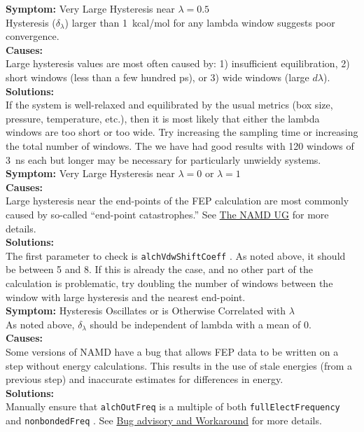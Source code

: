 \documentclass[9pt,tutorial]{Styling/livecoms}
\newcommand{\textInput}[1]{
  \texttt{#1}
}
\begin{document}
\noindent\textbf{Symptom:} Very Large Hysteresis near $\lambda=0.5$\\
Hysteresis ($\delta_\lambda$) larger than 1~kcal/mol for any lambda window suggests poor convergence.\\
\textbf{Causes:}\\
Large hysteresis values are most often caused by: 1) insufficient equilibration, 2) short windows (less than a few hundred ps), or 3) wide windows (large $d\lambda$).\\
\textbf{Solutions:}\\
If the system is well-relaxed and equilibrated by the usual metrics (box size, pressure, temperature, etc.), then it is most likely that either the lambda windows are too short or too wide. Try increasing the sampling time or increasing the total number of windows. The we have had good results with 120 windows of 3~ns each but longer may be necessary for particularly unwieldy systems.\\

\noindent\textbf{Symptom:}  Very Large Hysteresis near $\lambda=0$ or $\lambda=1$\\
\textbf{Causes:}\\
Large hysteresis near the end-points of the FEP calculation are most commonly caused by so-called ``end-point catastrophes.'' See \href{https://www.ks.uiuc.edu/Research/namd/2.14/ug/node63.html}{The NAMD UG} for more details. \cite{Bernardi2020}\\  
\textbf{Solutions:}\\
The first parameter to check is \textInput{alchVdwShiftCoeff}. As noted above, it should be between 5 and 8. If this is already the case, and no other part of the calculation is problematic, try doubling the number of windows between the window with large hysteresis and the nearest end-point.\\

\noindent\textbf{Symptom:}  Hysteresis Oscillates or is Otherwise Correlated with $\lambda$\\
As noted above, $\delta_\lambda$ should be independent of lambda with a mean of 0. \\
\textbf{Causes:}\\
Some versions of NAMD have a bug that allows FEP data to be written on a step without energy calculations. This results in the use of stale energies (from a previous step) and inaccurate estimates for differences in energy.\\
\textbf{Solutions:}\\
Manually ensure that \textInput{alchOutFreq} is a multiple of both \textInput{fullElectFrequency} and \textInput{nonbondedFreq}. See \href{https://www.ks.uiuc.edu/Research/namd/mailing_list/namd-l.2020-2021/1487.html}{Bug advisory and Workaround} for more details.\\
\end{document}
